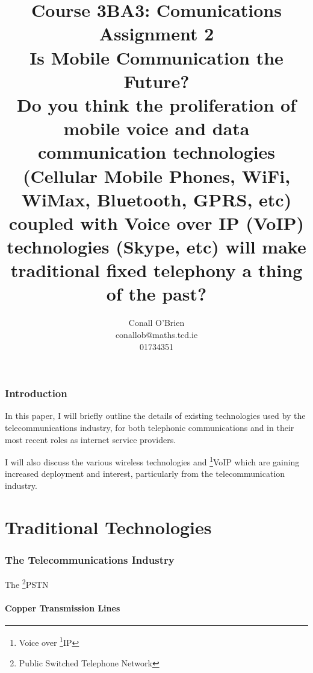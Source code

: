 \documentclass[a4paper,12pt]{article}
\begin{document}
\title{Course 3BA3: Comunications \\ \vspace{10mm} Assignment 2 \\
\vspace{10mm} Is Mobile Communication the Future? \\ \vspace{10mm}
{\small Do you think the proliferation of mobile voice and data communication
technologies (Cellular Mobile Phones, WiFi, WiMax, Bluetooth, GPRS, etc)
coupled with Voice over IP (VoIP) technologies (Skype, etc) will make
traditional fixed telephony a thing of the past?}}

\author{Conall O'Brien \\ conallob@maths.tcd.ie \\ 01734351}

\maketitle

\section{Introduction}

In this paper, I will briefly outline the details of existing
technologies used by the telecommunications industry, for both
telephonic communications and in their most recent roles as internet
service providers.


I will also discuss the various wireless technologies and
\footnote{Voice over \footnote{Internet Protocol}{IP}}{VoIP} which are
gaining increased deployment and interest, particularly from the
telecommunication industry.

\part{Traditional Technologies}

\section{The Telecommunications Industry}

The \footnote{Public Switched Telephone Network}{PSTN}

\subsection{Copper Transmission Lines}
\end{document}
